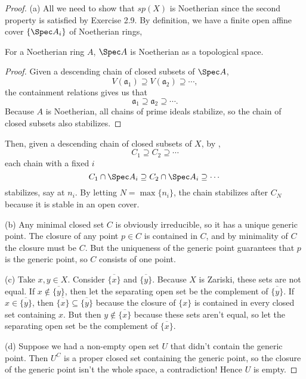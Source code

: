 \begin{proof}
	(a) All we need to show that $sp(X) $ is Noetherian since the second property is satisfied by Exercise 2.9.
	By definition, we have a finite open affine cover $\{\Spec A_i\} $ of Noetherian rings,
	\begin{lem}\label{lem:noetherian_ring}
		For a Noetherian ring $A $, $\Spec A $ is Noetherian as a topological space.
	\end{lem}
	\begin{proof}
		Given a descending chain of closed subsets of $\Spec A $,
		\[
			V(\mathfrak{a}_1) \supseteq V(\mathfrak{a}_2) \supseteq \cdots,
		\] 
		the containment relations gives us that
		\[
			\mathfrak{a}_1 \supseteq \mathfrak{a}_2 \supseteq \cdots
		.\] 
		Because $A $ is Noetherian, all chains of prime ideals stabilize, so the chain of closed subsets also stabilizes.
	\end{proof}
	Then, given a descending chain of closed subsets of $X $, by , 
	\[
		C_{1} \supseteq C_{2} \supseteq \cdots
	\] 
	each chain with a fixed $i $
	\[
		C_{1}\cap \Spec A_i \supseteq C_{2}\cap \Spec A_i \supseteq \cdots
	\] 
	stabilizes, say at $n_i $.
	By letting $N = \max \{n_i\} $, the chain stabilizes after $C_N $ because it is stable in an open cover.

	(b) Any minimal closed set $C $ is obviously irreducible, so it has a unique generic point.
	The closure of any point $p \in C $ is contained in $C $, and by minimality of $C $ the closure must be $C $.
	But the uniqueness of the generic point guarantees that $p $ is the generic point, so $C $ consists of one point.

	(c) Take $x,y \in X $.
	Consider $\overline{\{x\}  }$ and  $\overline{\{y\}  }  $.
	Because $X $ is Zariski, these sets are not equal.
	If $x\notin \overline{\{y\}  }  $, then let the separating open set be the complement of $\overline{\{y\}  } $.
	If $x \in \overline{\{y\}  }  $, then $\overline{\{x\}  } \subseteq \overline{\{y\}  }$ because the closure of $\{x\}   $ is contained in every closed set containing $x $.
	But then $y\notin \overline{\{x\}  }  $ because these sets aren't equal, so let the separating open set be the complement of $\overline{\{x\}  }  $.

	(d) Suppose we had a non-empty open set $U $ that didn't contain the generic point.
	Then $U^C $ is a proper closed set containing the generic point, so the closure of the generic point isn't the whole space, a contradiction!
	Hence $U $ is empty.


\end{proof}
